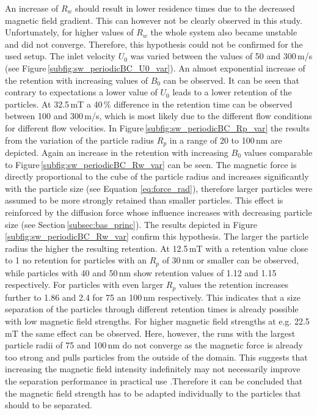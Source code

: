 An increase of $R_{w}$ should result in lower residence times due to the decreased magnetic field gradient. This can however not be clearly observed in this study. Unfortunately, for higher values of $R_{w}$ the whole system also became unstable and did not converge. Therefore, this hypothesis could not be confirmed for the used setup. The inlet velocity $U_{0}$ was varied between the values of 50 and 300\,\textmu m/s (see Figure\,\ref{subfig:sw_periodicBC_U0_var}). An almost exponential increase of the retention with increasing values of $B_{0}$ can be observed. It can be seen that contrary to expectations a lower value of $U_{0}$ leads to a lower retention of the particles. At 32.5\,mT a 40\,\% difference in the retention time can be observed between 100 and 300\,\textmu m/s, which is most likely due to the different flow conditions for different flow velocities. In Figure\,\ref{subfig:sw_periodicBC_Rp_var} the results from the variation of the particle radius $R_{p}$ in a range of 20 to 100\,nm are depicted. Again an increase in the retention with increasing $B_{0}$ values comparable to Figure\,\ref{subfig:sw_periodicBC_Rw_var} can be seen. The magnetic force is directly proportional to the cube of the particle radius and increases significantly with the particle size (see Equation \ref{eq:force_rad}), therefore larger particles were assumed to be more strongly retained than smaller particles. This effect is reinforced by the diffusion force whose influence increases with decreasing particle size (see Section\,\ref{subsec:bas_princ}). The results depicted in Figure \ref{subfig:sw_periodicBC_Rw_var} confirm this hypothesis. The larger the particle radius the higher the resulting retention. At 12.5\,mT with a retention value close to 1 no retention for particles with an $R_{p}$ of 30\,nm or smaller can be observed, while particles with 40 and 50\,nm show retention values of 1.12 and 1.15 respectively. For particles with even larger $R_{p}$ values the retention increases further to 1.86 and 2.4 for 75 an 100\,nm respectively. This indicates that a size separation of the particles through different retention times is already possible with low magnetic field strengths. For higher magnetic field strengths at e.g. 22.5\,mT the same effect can be observed. Here, however, the runs with the largest particle radii of 75 and 100\,nm do not converge as the magnetic force is already too strong and pulls particles from the outside of the domain. This suggests that increasing the magnetic field intensity indefinitely may not necessarily improve the separation performance in practical use \cite{ge2017magnetic}.Therefore it can be concluded that the magnetic field strength has to be adapted individually to the particles that should to be separated.\\ 

